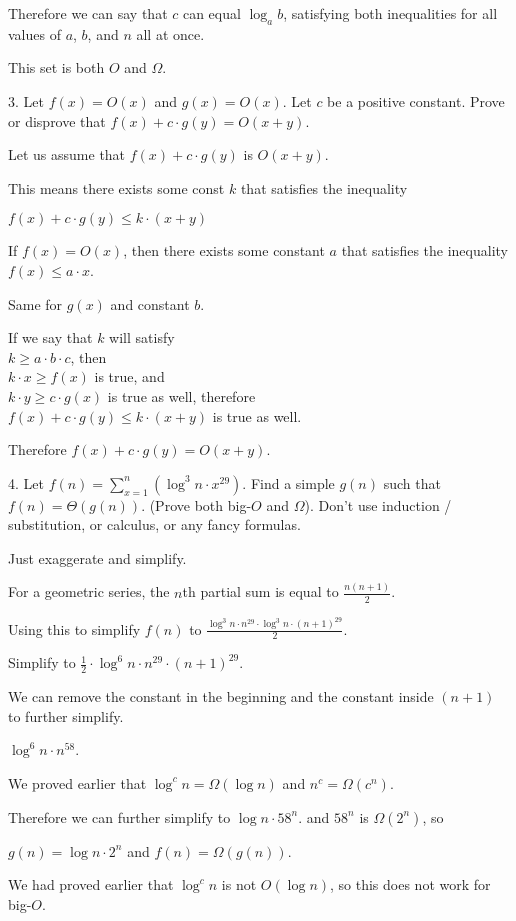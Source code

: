 \documentclass[12pt]{report}
\begin{document}
Therefore we can say that $c$ can equal $\log_a b$, satisfying
both inequalities for all values of $a$, $b$, and $n$ all at once.

This set is both $O$ and $\Omega$.

\pagebreak

3. Let $f(x) = O(x)$ and $g(x) = O(x)$. Let $c$ be a positive constant.
Prove or disprove that $f(x) + c \cdot g(y) = O(x + y)$.

Let us assume that $f(x) + c \cdot g(y)$ is $O(x + y)$.

This means there exists some const $k$ that satisfies the inequality

$f(x) + c\cdot g(y) \leq k \cdot (x + y)$

If $f(x) = O(x)$, then there exists some constant $a$ that satisfies
the inequality $f(x) \leq a \cdot x$.

Same for $g(x)$ and constant $b$.

If we say that $k$ will satisfy \\$k \geq a \cdot b \cdot c$, then
\\$k \cdot x \geq f(x)$ is true, and
\\$k \cdot y \geq c \cdot g(x)$ is true as well, therefore
\\$f(x) + c\cdot g(y) \leq k \cdot (x + y)$ is true as well.

Therefore $f(x) + c \cdot g(y) = O(x+ y)$.

\pagebreak

4. Let $f(n) = \sum_{x=1}^n(\log^3n \cdot x^{29})$. Find a simple $g(n)$ such that
$f(n) = \Theta(g(n))$. (Prove both big-$O$ and $\Omega$). Don't use induction / substitution,
or calculus, or any fancy formulas.

Just exaggerate and simplify.

For a geometric series, the $n$th partial sum is equal to $\frac{n(n+1)}{2}$.

Using this to simplify $f(n)$ to
$\frac{\log^3n \cdot n^{29} \cdot \log^3n \cdot (n + 1)^{29}}{2}$.

Simplify to  $\frac{1}{2} \cdot \log^6n \cdot n^{29} \cdot (n + 1)^{29}$.

We can remove the constant in the beginning and the constant inside $(n + 1)$
to further simplify.

$\log^6n \cdot n^{58}$.

We proved earlier that $\log^cn = \Omega(\log n)$ and
$n^c = \Omega(c^n)$.

Therefore we can further simplify to $\log n \cdot 58^n$.
and $58^n$ is $\Omega(2^n)$, so 

$g(n) = \log n \cdot 2^n$ and $f(n) = \Omega(g(n))$.

We had proved earlier that $\log^cn$ is not $O(\log n)$, so
this does not work for big-$O$.
\end{document}
